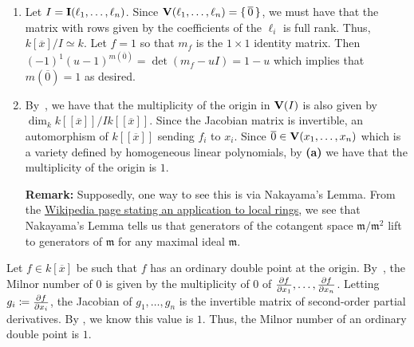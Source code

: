 \documentclass[letterpaper, 11pt, oneside]{book}
\begin{document}
\begin{sol}\label{ex:UAG_4.2.15}
  \begin{enumerate}
    \item Let $I = \operatorname{\mathbf{I}}(\ell_{1}, \ldots, \ell_{n})$.
          Since $\operatorname{\mathbf{V}}(\ell_{1}, \ldots, \ell_{n}) = \set{\overline{0}}$, we must have that the matrix with rows given by the coefficients of the $\ell_{i}$ is full rank.
          Thus, $k[\overline{x}] / I \simeq k$.
          Let $f = 1$ so that $m_{f}$ is the $1 \times 1$ identity matrix.
          Then $(-1)^{1} (u - 1)^{m(\overline{0})} = \det(m_{f} - uI) = 1 - u$ which implies that $m(\overline{0}) = 1$ as desired.
    \item By~\cite[\S 4.2, Proposition 2.11]{book:UAG}, we have that the multiplicity of the origin in $\operatorname{\mathbf{V}}(I)$ is also given by $\dim_{k} k[[\overline{x}]] / Ik[[\overline{x}]]$.
          Since the Jacobian matrix is invertible,  an automorphism of $k[[\overline{x}]]$ sending $f_{i}$ to $x_{i}$.
          Since $\overline{0} \in \operatorname{\mathbf{V}}(x_{1}, \ldots, x_{n})$ which is a variety defined by homogeneous linear polynomials, by \textbf{(a)} we have that the multiplicity of the origin is $1$.

          \textbf{Remark:} Supposedly, one way to see this is via Nakayama's Lemma.
          From the \href{https://en.wikipedia.org/wiki/Nakayama%27s_lemma#Local_rings}{Wikipedia page stating an application to local rings}, we see that Nakayama's Lemma tells us that generators of the cotangent space $\mathfrak{m} / \mathfrak{m}^{2}$ lift to generators of $\mathfrak{m}$ for any maximal ideal $\mathfrak{m}$.
  \end{enumerate}
\end{sol}

\begin{sol}\label{ex:UAG_4.2.16}
  Let $f \in k[\overline{x}]$ be such that $f$ has an ordinary double point at the origin.
  By~\cite[\S 4.2, Proposition 2.11]{book:UAG}, the Milnor number of $0$ is given by the multiplicity of $0$ of $\ideal{\frac{\partial f}{\partial x_{1}}, \ldots, \frac{\partial f}{\partial x_{n}}}$.
  Letting $g_{i} \coloneqq \frac{\partial f}{\partial x_{i}}$, the Jacobian of $g_{1}, \ldots, g_{n}$ is the invertible matrix of second-order partial derivatives.
  By , we know this value is $1$.
  Thus, the Milnor number of an ordinary double point is $1$.
\end{sol}

\clearpage
\end{document}
